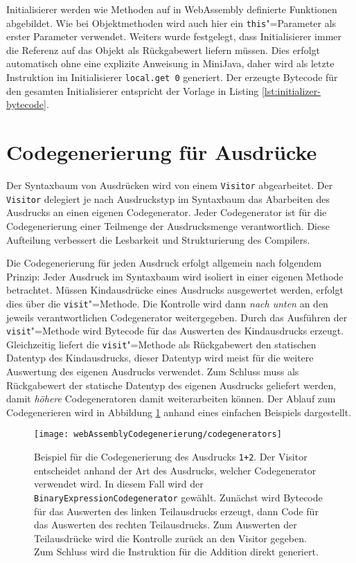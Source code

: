 Initialisierer werden wie Methoden auf in WebAssembly definierte Funktionen abgebildet. Wie bei Objektmethoden wird auch hier ein \lstinline{this}"=Parameter als erster Parameter verwendet. Weiters wurde festgelegt, dass Initialisierer immer die Referenz auf das Objekt als Rückgabewert liefern müssen. Dies erfolgt automatisch ohne eine explizite Anweisung in MiniJava, daher wird als letzte Instruktion im Initialisierer \lstinline{local.get 0} generiert. Der erzeugte Bytecode für den gesamten Initialisierer entspricht der Vorlage in Listing \ref{lst:initializer-bytecode}.

\pagebreak


\section{Codegenerierung für Ausdrücke}
\label{sec:Codegenerierung-für-Ausdrücke}

Der Syntaxbaum von Ausdrücken wird von einem \lstinline{Visitor} abgearbeitet. Der \lstinline{Visitor} delegiert je nach Ausdruckstyp im Syntaxbaum das Abarbeiten des Ausdrucks an einen eigenen Codegenerator. Jeder Codegenerator ist für die Codegenerierung einer Teilmenge der Ausdrucksmenge verantwortlich. Diese Aufteilung verbessert die Lesbarkeit und Strukturierung des Compilers.

Die Codegenerierung für jeden Ausdruck erfolgt allgemein nach folgendem Prinzip: Jeder Ausdruck im Syntaxbaum wird isoliert in einer eigenen Methode betrachtet. Müssen Kindausdrücke eines Ausdrucks ausgewertet werden, erfolgt dies über die \lstinline{visit}"=Methode. Die Kontrolle wird dann \emph{nach unten} an den jeweils verantwortlichen Codegenerator weitergegeben. Durch das Ausführen der \lstinline{visit}"=Methode wird Bytecode für das Auswerten des Kindausdrucks erzeugt. Gleichzeitig liefert die \lstinline{visit}"=Methode als Rückgabewert den statischen Datentyp des Kindausdrucks, dieser Datentyp wird meist für die weitere Auswertung des eigenen Ausdrucks verwendet. Zum Schluss muss als Rückgabewert der statische Datentyp des eigenen Ausdrucks geliefert werden, damit \emph{höhere} Codegeneratoren damit weiterarbeiten können. Der Ablauf zum Codegenerieren wird in Abbildung \ref{fig:codegenerators} anhand eines einfachen Beispiels dargestellt.

\begin{figure}
    \centering
    \texttt{[image: webAssemblyCodegenerierung/codegenerators]}
    \caption{Beispiel für die Codegenerierung des Ausdrucks \lstinline{1+2}. Der Visitor entscheidet anhand der Art des Ausdrucks, welcher Codegenerator verwendet wird. In diesem Fall wird der \lstinline{BinaryExpressionCodegenerator} gewählt. Zunächst wird Bytecode für das Auswerten des linken Teilausdrucks erzeugt, dann Code für das Auswerten des rechten Teilausdrucks. Zum Auswerten der Teilausdrücke wird die Kontrolle zurück an den Visitor gegeben. Zum Schluss wird die Instruktion für die Addition direkt generiert.}
    \label{fig:codegenerators}
\end{figure}

